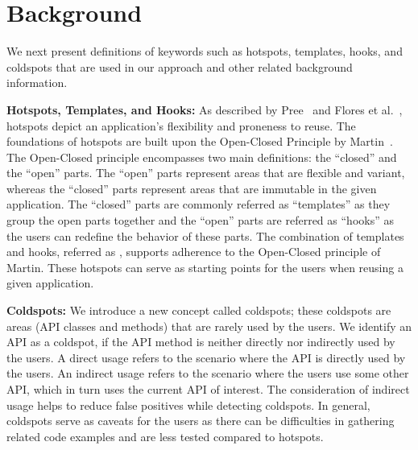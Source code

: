 \section {Background}\vspace*{-2ex}
\label{sec:background} 
We next present definitions of keywords such
as hotspots, templates, hooks, and coldspots that are used in our
approach and other related background information.

\textbf{Hotspots, Templates, and Hooks:} 
As described by Pree~\cite{pree:metapatterns} and Flores et
al.~\cite{flores:hotspotter}, hotspots depict an application's
flexibility and proneness to reuse. The foundations of hotspots are
built upon the Open-Closed Principle by Martin~\cite{martic:openclosed}.
The Open-Closed principle encompasses two main definitions: the
``closed'' and the ``open'' parts. The ``open'' parts represent
areas that are flexible and variant, whereas the ``closed'' parts
represent areas that are immutable in the given application. The
``closed'' parts are commonly referred as ``templates'' as they
group the open parts together and the ``open'' parts are referred as
``hooks'' as the users can redefine the behavior of these
parts. The combination of templates and hooks, referred as , 
supports adherence to the Open-Closed
principle of Martin. These hotspots can serve as starting
points for the users when reusing a given application.

\textbf{Coldspots:}
We introduce a new concept called coldspots; these
coldspots are areas (API classes and methods) that are rarely used
by the users. We identify an API as a coldspot, if the API method
is neither directly nor indirectly used by the users. A
direct usage refers to the scenario where the API is directly used
by the users. An indirect usage refers to the scenario where
the users use some other API, which in turn uses the
current API of interest. The consideration of indirect usage helps
to reduce false positives while detecting coldspots. In general,
coldspots serve as caveats for the users as there can be difficulties
in gathering related code examples and are less tested compared
to hotspots.